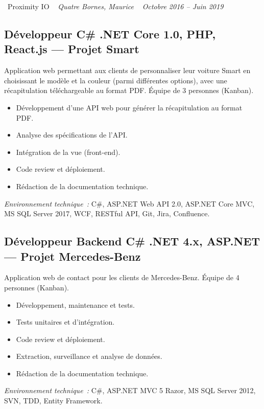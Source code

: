 \documentclass[10pt,a4paper]{article}
\begin{document}
\vspace{10pt}

\noindent\textcolor{primary}{ \faBuilding\ Proximity IO} \quad
\textit{ \small \textcolor{darkgray}{ \faMapMarker\ } Quatre Bornes, Maurice } \hfill
\textit{ \small \textcolor{darkgray}{ \faCalendar\ } Octobre 2016 -- Juin 2019 }

\vspace{4pt}

\subsection*{Développeur C\# .NET Core 1.0, PHP, React.js --- Projet Smart}
\color{darkgray}
Application web permettant aux clients de personnaliser leur voiture Smart en choisissant le modèle et la couleur (parmi différentes options), avec une récapitulation téléchargeable au format PDF. Équipe de 3 personnes (Kanban).
\begin{itemize}
  \item Développement d'une API web pour générer la récapitulation au format PDF.
  \item Analyse des spécifications de l'API.
  \item Intégration de la vue (front-end).
  \item Code review et déploiement.
  \item Rédaction de la documentation technique.
\end{itemize}
\textit{Environnement technique~:} C\#, ASP.NET Web API 2.0, ASP.NET Core MVC, MS SQL Server 2017, WCF, RESTful API, Git, Jira, Confluence.

\vspace{6pt}

\subsection*{Développeur Backend C\# .NET 4.x, ASP.NET --- Projet Mercedes-Benz}
\color{darkgray}
Application web de contact pour les clients de Mercedes-Benz. Équipe de 4 personnes (Kanban).
\begin{itemize}
  \item Développement, maintenance et tests.
  \item Tests unitaires et d'intégration.
  \item Code review et déploiement.
  \item Extraction, surveillance et analyse de données.
  \item Rédaction de la documentation technique.
\end{itemize}
\textit{Environnement technique~:} C\#, ASP.NET MVC 5 Razor, MS SQL Server 2012, SVN, TDD, Entity Framework.
\end{document}
